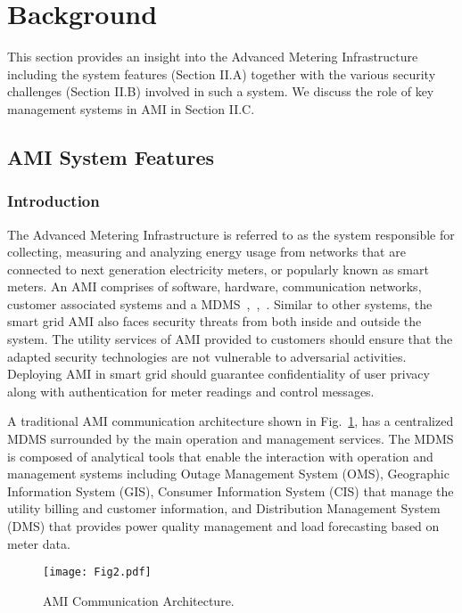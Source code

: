 \section{Background}
This section provides an insight into the Advanced Metering Infrastructure including the system features (Section II.A) together with the various security challenges (Section II.B) involved in such a system. We discuss the role of key management systems in AMI in Section II.C. 
\subsection{AMI System Features}
\subsubsection{Introduction}
The Advanced Metering Infrastructure is referred to as the system responsible for collecting, measuring and analyzing energy usage from networks that are connected to next generation electricity meters, or popularly known as smart meters. An AMI comprises of software, hardware, communication networks, customer associated systems and a MDMS~\cite{George16},~\cite{Zhou12},~\cite{Sharma15}. Similar to other systems, the smart grid AMI also faces security threats from both inside and outside the system. The utility services of AMI provided to customers should ensure that the adapted security technologies are not vulnerable to adversarial activities. Deploying AMI in smart grid should guarantee confidentiality of user privacy along with authentication for meter readings and control messages. 


A traditional AMI communication architecture shown in Fig.~\ref{fig:Fig_2}, has a centralized MDMS surrounded by the main operation and management services. The MDMS is composed of analytical tools that enable the interaction with operation and management systems including Outage Management System (OMS), Geographic Information System (GIS), Consumer Information System (CIS) that manage the utility billing and customer information, and Distribution Management System (DMS) that provides power quality management and load forecasting based on meter data.
\begin{figure}[h]
 \centering %
 \texttt{[image: Fig2.pdf]}
 \caption{AMI Communication Architecture.}
 \label{fig:Fig_2}
\end{figure}
